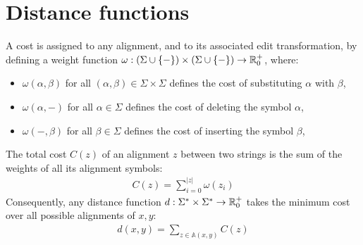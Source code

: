 %
%



\section{Distance functions}

A cost is assigned to any alignment, and to its associated edit transformation, by defining a weight function $\omega : (\Sigma \cup \{ - \}) \times (\Sigma \cup \{ - \}) \rightarrow \mathbb {R}_0^{+}$, where:
\begin{itemize}
\item $\omega(\alpha,\beta)$ for all $(\alpha,\beta) \in \Sigma \times \Sigma$ defines the cost of substituting $\alpha$ with $\beta$,
\item $\omega(\alpha,-)$ for all $\alpha \in \Sigma$ defines the cost of deleting the symbol $\alpha$,
\item $\omega(-,\beta)$ for all $\beta \in \Sigma$ defines the cost of inserting the symbol $\beta$,
\end{itemize}

The total cost $C(z)$ of an alignment $z$ between two strings is the sum of the weights of all its alignment symbols:
\begin{eqnarray}
C(z) = \sum_{i=0}^{|z|}{\omega(z_i)}
\end{eqnarray}
Consequently, any distance function $d : \Sigma^{*} \times \Sigma^{*} \rightarrow \mathbb {R}_0^{+}$ takes the minimum cost over all possible alignments of $x,y$:
\begin{eqnarray}
d(x,y) = \sum_{z \in \mathbb{A}(x,y)}{C(z)}
\end{eqnarray}

